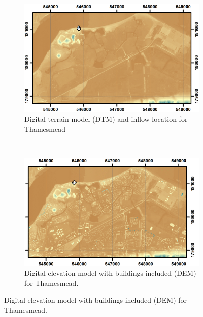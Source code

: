 \begin{figure}[p]
	\centering
	\begin{subfigure}[t]{0.5\textwidth}
		\centering
		\includegraphics[width=1.0\textwidth]{heterogeneous-dev-figures/Thamesmead_DTM.png}
		\caption{Digital terrain model (DTM) and inflow location for Thamesmead}
	\end{subfigure}%
	~ 
	\begin{subfigure}[t]{0.5\textwidth}
		\centering
		\includegraphics[width=1.0\textwidth]{heterogeneous-dev-figures/Thamesmead_DEM.png}
		\caption{Digital elevation model with buildings included (DEM) for Thamesmead.}
	\end{subfigure}
	

\end{figure}
